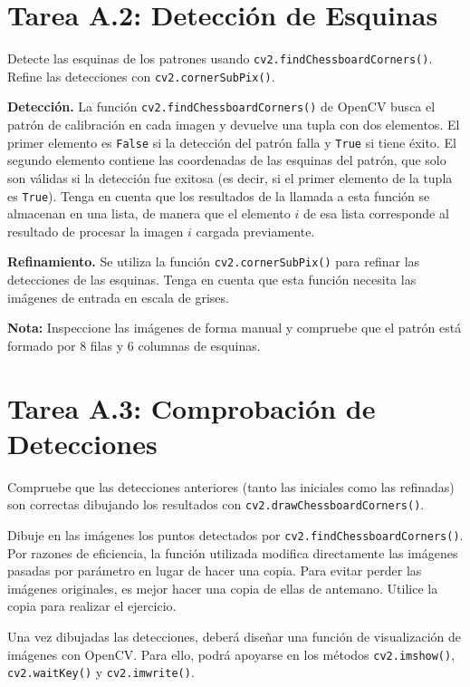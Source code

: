 \section*{Tarea A.2: Detección de Esquinas}
Detecte las esquinas de los patrones usando \texttt{cv2.findChessboardCorners()}. Refine las detecciones con \texttt{cv2.cornerSubPix()}.

\textbf{Detección.} La función \texttt{cv2.findChessboardCorners()} de OpenCV busca el patrón de calibración en cada imagen y devuelve una tupla con dos elementos. El primer elemento es \texttt{False} si la detección del patrón falla y \texttt{True} si tiene éxito. El segundo elemento contiene las coordenadas de las esquinas del patrón, que solo son válidas si la detección fue exitosa (es decir, si el primer elemento de la tupla es \texttt{True}). Tenga en cuenta que los resultados de la llamada a esta función se almacenan en una lista, de manera que el elemento $i$ de esa lista corresponde al resultado de procesar la imagen $i$ cargada previamente.

\textbf{Refinamiento.} Se utiliza la función \texttt{cv2.cornerSubPix()} para refinar las detecciones de las esquinas. Tenga en cuenta que esta función necesita las imágenes de entrada en escala de grises.

\textbf{Nota:} Inspeccione las imágenes de forma manual y compruebe que el patrón está formado por 8 filas y 6 columnas de esquinas.


\section*{Tarea A.3: Comprobación de Detecciones}
Compruebe que las detecciones anteriores (tanto las iniciales como las refinadas) son correctas dibujando los resultados con \texttt{cv2.drawChessboardCorners()}.

Dibuje en las imágenes los puntos detectados por \texttt{cv2.findChessboardCorners()}. Por razones de eficiencia, la función utilizada modifica directamente las imágenes pasadas por parámetro en lugar de hacer una copia. Para evitar perder las imágenes originales, es mejor hacer una copia de ellas de antemano. Utilice la copia para realizar el ejercicio.

Una vez dibujadas las detecciones, deberá diseñar una función de visualización de imágenes con OpenCV. Para ello, podrá apoyarse en los métodos \texttt{cv2.imshow()}, \texttt{cv2.waitKey()} y \texttt{cv2.imwrite()}.


